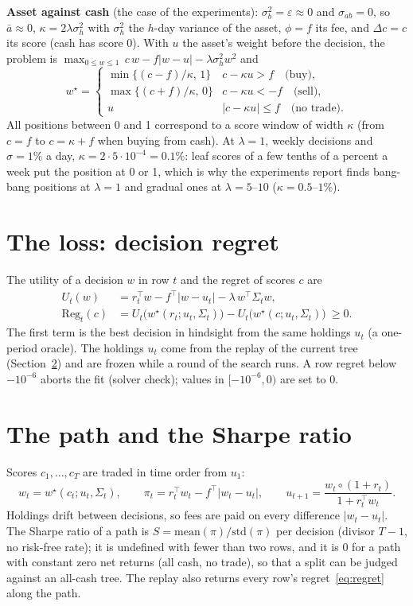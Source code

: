 \documentclass[11pt,a4paper]{article}
\newcommand{\1}{\mathbf{1}}
\newcommand{\Reg}{\mathrm{Reg}}
\begin{document}
\textbf{Asset against cash} (the case of the experiments): $\sigma_b^2=\varepsilon\approx0$ and $\sigma_{ab}=0$, so $\bar a\approx0$, $\kappa=2\lambda\sigma_h^2$ with $\sigma_h^2$ the $h$-day variance of the asset, $\phi=f$ its fee, and $\Delta c=c$ its score (cash has score 0). With $u$ the asset's weight before the decision, the problem is $\max_{0\le w\le1}\,c\,w-f|w-u|-\lambda\sigma_h^2w^2$ and
\begin{equation}\label{eq:cash}
w^\star=\begin{cases}
\min\{(c-f)/\kappa,\,1\} & c-\kappa u>f\quad\text{(buy)},\\
\max\{(c+f)/\kappa,\,0\} & c-\kappa u<-f\quad\text{(sell)},\\
u & |c-\kappa u|\le f\quad\text{(no trade)}.
\end{cases}
\end{equation}
All positions between 0 and 1 correspond to a score window of width $\kappa$ (from $c=f$ to $c=\kappa+f$ when buying from cash). At $\lambda=1$, weekly decisions and $\sigma=1\%$ a day, $\kappa=2\cdot5\cdot10^{-4}=0.1\%$: leaf scores of a few tenths of a percent a week put the position at 0 or 1, which is why the experiments report finds bang-bang positions at $\lambda=1$ and gradual ones at $\lambda=5$--$10$ ($\kappa=0.5$--$1\%$).

\section{The loss: decision regret}\label{sec:loss}
The utility of a decision $w$ in row $t$ and the regret of scores $c$ are
\begin{align}
U_t(w)&=r_t^\top w-f^\top|w-u_t|-\lambda\,w^\top\Sigma_t w,\label{eq:utility}\\
\Reg_t(c)&=U_t\big(w^\star(r_t;u_t,\Sigma_t)\big)-U_t\big(w^\star(c;u_t,\Sigma_t)\big)\ \ge0 .\label{eq:regret}
\end{align}
The first term is the best decision in hindsight from the same holdings $u_t$ (a one-period oracle). The holdings $u_t$ come from the replay of the current tree (Section~\ref{sec:path}) and are frozen while a round of the search runs. A row regret below $-10^{-6}$ aborts the fit (solver check); values in $[-10^{-6},0)$ are set to $0$.

\section{The path and the Sharpe ratio}\label{sec:path}
Scores $c_1,\dots,c_T$ are traded in time order from $u_1$:
\begin{equation}\label{eq:path}
w_t=w^\star(c_t;u_t,\Sigma_t),\qquad \pi_t=r_t^\top w_t-f^\top|w_t-u_t|,\qquad u_{t+1}=\frac{w_t\circ(1+r_t)}{1+r_t^\top w_t}.
\end{equation}
Holdings drift between decisions, so fees are paid on every difference $|w_t-u_t|$. The Sharpe ratio of a path is $S=\mathrm{mean}(\pi)/\mathrm{std}(\pi)$ per decision (divisor $T-1$, no risk-free rate); it is undefined with fewer than two rows, and it is $0$ for a path with constant zero net returns (all cash, no trade), so that a split can be judged against an all-cash tree. The replay also returns every row's regret~\eqref{eq:regret} along the path.
\end{document}
